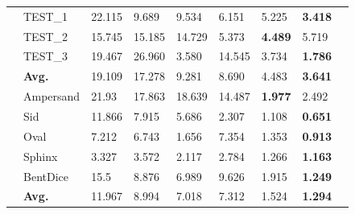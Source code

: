 \begin{table}[!t]
{\begin{tabular}{C{0.1cm}C{1.8cm}|C{1.25cm}C{1.25cm}C{1.25cm}C{1.25cm}C{1.25cm}C{1.25cm}C{1.25cm}}
\midrule
\midrule
        & 
        TEST\_1&   22.115 &  9.689 &  9.534 &  6.151 &  5.225 &  \textbf{3.418} \\
        &TEST\_2 &  15.745 &  15.185 &  14.729 &  5.373 &  \textbf{4.489} &  5.719 \\
        &TEST\_3 &  19.467 &  26.960 &  3.580 &  14.545 &  3.734 &  \textbf{1.786} \\
         \cmidrule(l){2-8}
       &\textbf{Avg.} &  19.109 &  17.278 &  9.281 &  8.690 &  4.483 &  \textbf{3.641} \\

\midrule
\midrule
         &
        Ampersand & 21.93 &  17.863 &  18.639 &  14.487 &  \textbf{1.977} &  2.492 \\
        &Sid & 11.866 &  7.915 &  5.686 &  2.307 &  1.108 &  \textbf{0.651} \\
        &Oval& 7.212 &  6.743 &  1.656 &  7.354 &  1.353 &  \textbf{0.913} \\
        &Sphinx& 3.327 &  3.572 &  2.117 &  2.784 &  1.266 &  \textbf{1.163} \\
       & BentDice& 15.5 &  8.876 &  6.989 &  9.626 &  1.915 &  \textbf{1.249} \\
       \cmidrule(l){2-8}
      &\textbf{Avg.}& 11.967 &  8.994 &  7.018 &  7.312 &  1.524 &  \textbf{1.294} \\

        \bottomrule
    \end{tabular} 
    }
\end{table}
